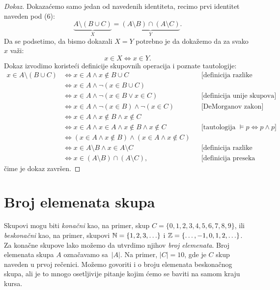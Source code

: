 \begin{proof}[Dokaz]
  Dokaza\'cemo samo jedan od navedenih identiteta, recimo prvi identitet naveden pod (6):
  $$
    \underbrace{A \setminus (B \cup C)}_X = \underbrace{(A \setminus B) \cap (A \setminus C)}_Y.
  $$
  Da se podsetimo, da bismo dokazali $X = Y$ potrebno je da doka\v zemo da za svako $x$ va\v zi:
  $$
    x \in X \Leftrightarrow x \in Y.
  $$
  Dokaz izvodimo koriste\'ci definicije skupovnih operacija i poznate tautologije:
  \begin{align*}
    x \in A \setminus (B \cup C)
    & \Leftrightarrow x \in A \land x \notin B \cup C && \text{[definicija razlike skupova]}\\
    & \Leftrightarrow x \in A \land \lnot(x \in B \cup C) \\
    & \Leftrightarrow x \in A \land \lnot(x \in B \lor x \in C) && \text{[definicija unije skupova]}\\
    & \Leftrightarrow x \in A \land \lnot(x \in B) \land \lnot(x \in C) && \text{[DeMorganov zakon]}\\
    & \Leftrightarrow x \in A \land x \notin B \land x \notin C \\
    & \Leftrightarrow x \in A \land x \in A \land x \notin B \land x \notin C && \text{[tautologija $\vDash p \Leftrightarrow p \land p$]}\\
    & \Leftrightarrow (x \in A \land x \notin B) \land (x \in A \land x \notin C) \\
    & \Leftrightarrow x \in A \setminus B \land x \in A \setminus C && \text{[definicija razlike skupova]} \\
    & \Leftrightarrow x \in (A \setminus B) \cap (A \setminus C), && \text{[definicija preseka skupova]}
  \end{align*}
  \v cime je dokaz zavr\v sen.
\end{proof}

\section{Broj elemenata skupa}

Skupovi mogu biti \emph{kona\v cni} kao, na primer, skup $C = \{0, 1, 2, 3, 4, 5, 6, 7, 8, 9\}$,
ili \emph{beskona\v cni} kao, na primer, skupovi $\mathbb{N} = \{ 1, 2, 3, \ldots \}$ i $\mathbb{Z} = \{ \ldots, -1, 0, 1, 2, \ldots\}$.
Za kona\v cne skupove lako mo\v zemo da utvrdimo njihov \emph{broj elemenata}.
Broj elemenata skupa $A$ ozna\v cavamo sa~$|A|$.
Na primer, $|C| = 10$, gde je $C$ skup naveden u prvoj re\v cenici. Mo\v zemo govoriti i o broju elemenata beskona\v cnog
skupa, ali je to mnogo osetljivije pitanje kojim \'cemo se baviti na samom kraju kursa.

